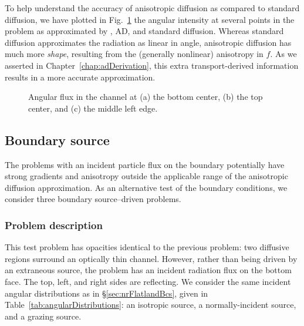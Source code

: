 \thesisclearpage

To help understand the accuracy of anisotropic diffusion as compared to standard
diffusion, we have plotted in Fig.~\ref{fig:bcReactorAngular} the angular
intensity at several points in the problem as approximated by \SN, AD, and
standard diffusion. Whereas standard diffusion approximates the radiation as linear in
angle, anisotropic diffusion has much more \emph{shape}, resulting from the
(generally nonlinear)
anisotropy in $f$. As we asserted in Chapter~\ref{chap:adDerivation}, this extra
transport-derived information results in a more accurate approximation.

\begin{figure}[htb]
  \centering\small

  \caption{Angular flux in the channel at (a) the bottom center, (b) the top
  center, and (c) the middle left edge.}
  \label{fig:bcReactorAngular}
\end{figure}

\subsection{Boundary source}

The problems with an incident particle flux on the boundary potentially have
strong gradients and anisotropy outside the applicable range of the anisotropic
diffusion approximation. As an alternative test of the boundary conditions, we
consider three boundary source--driven problems.

\subsubsection{Problem description}

This test problem has opacities identical to the previous problem: two diffusive
regions surround an optically thin channel. However, rather than being driven
by an extraneous source, the problem has an incident radiation flux on the
bottom face. The top, left, and right sides are reflecting. We consider the same
incident angular distributions as in \S\ref{sec:nrFlatlandBcs}, given in
Table~\ref{tab:angularDistributions}: an isotropic
source, a normally-incident source, and a grazing source.

